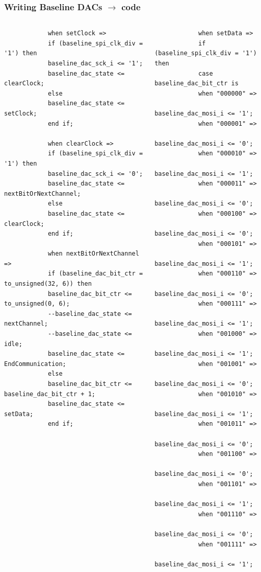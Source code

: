 \documentclass[aspectratio=169]{beamer}
\begin{document}
	\begin{frame}[fragile]
	\frametitle{Writing Baseline DACs $\rightarrow$ code}
	{\tiny
	\begin{columns}
		\begin{center}
			\begin{verbatim}
			when setClock =>
			if (baseline_spi_clk_div = '1') then
			baseline_dac_sck_i <= '1';
			baseline_dac_state <= clearClock;
			else
			baseline_dac_state <= setClock;
			end if;
			
			when clearClock =>
			if (baseline_spi_clk_div = '1') then
			baseline_dac_sck_i <= '0';
			baseline_dac_state <= nextBitOrNextChannel;
			else
			baseline_dac_state <= clearClock;
			end if;
			
			when nextBitOrNextChannel =>
			if (baseline_dac_bit_ctr = to_unsigned(32, 6)) then
			baseline_dac_bit_ctr <= to_unsigned(0, 6);
			--baseline_dac_state <= nextChannel;
			--baseline_dac_state <= idle;
			baseline_dac_state <= EndCommunication;
			else
			baseline_dac_bit_ctr <= baseline_dac_bit_ctr + 1;
			baseline_dac_state <= setData;
			end if;
			\end{verbatim}
		\end{center}
	
		\begin{center}
			\begin{verbatim}
			when setData =>
			if (baseline_spi_clk_div = '1') then
			case baseline_dac_bit_ctr is
			when "000000" =>
			baseline_dac_mosi_i <= '1';
			when "000001" =>
			baseline_dac_mosi_i <= '0';
			when "000010" =>
			baseline_dac_mosi_i <= '1';
			when "000011" => 
			baseline_dac_mosi_i <= '0';		
			when "000100" =>
			baseline_dac_mosi_i <= '0';
			when "000101" =>
			baseline_dac_mosi_i <= '1';
			when "000110" =>
			baseline_dac_mosi_i <= '0';
			when "000111" =>
			baseline_dac_mosi_i <= '1';		
			when "001000" =>
			baseline_dac_mosi_i <= '1';
			when "001001" =>
			baseline_dac_mosi_i <= '0';
			when "001010" =>
			baseline_dac_mosi_i <= '1';
			when "001011" =>
			baseline_dac_mosi_i <= '0';			
			when "001100" =>
			baseline_dac_mosi_i <= '0';
			when "001101" =>
			baseline_dac_mosi_i <= '1';
			when "001110" =>
			baseline_dac_mosi_i <= '0';
			when "001111" =>
			baseline_dac_mosi_i <= '1';
			\end{verbatim}
		\end{center}
	

\end{columns}}
\end{frame}
\end{document}
